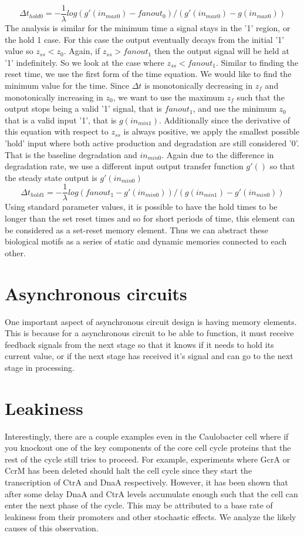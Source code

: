\documentclass{article}
\begin{document}
\[\Delta t_{hold0}= -\frac{1}{\lambda} log(g'(in_{max0}) -fanout_0)/(g'(in_{max0}) -g(in_{max0}))				
\]
The analysis is similar for the minimum time a signal stays in the '1' region, or the hold 1 case.  For this case the output eventually decays from the initial '1' value so $z_{ss}<z_0$. Again, if $z_{ss}>fanout_1$ then the output signal will be held at '1' indefinitely. So we look at the case where $z_{ss}<fanout_1$.  Similar to finding the reset time, we use the first form of the time equation.   We would like to find the minimum value for the time.  Since $\Delta t$ is monotonically decreasing in $z_f$ and monotonically increasing in $z_0$, we want to use the maximum $z_f$ such that the output stops being a valid '1' signal, that is $fanout_1$, and use the minimum $z_0$ that is a valid input '1', that is $g(in_{min1})$.  Additionally since the derivative of this equation with respect to $z_{ss}$ is always positive, we apply the smallest possible 'hold' input where both active production and degradation are still considered '0'.  That is the baseline degradation and $in_{min0}$.  Again due to the difference in degradation rate, we use a different input output transfer function $g'()$ so that the steady state output is $g'(in_{min0})$  
\[\Delta t_{hold1}= -\frac{1}{\lambda} log(fanout_1 -g'(in_{min0}))/(g(in_{min1}) -g'(in_{min0}))
\]
Using standard parameter values, it is possible to have the hold times to be longer than the set reset times and so for short periods of time, this element can be considered as a set-reset memory element.  Thus we can abstract these biological motifs as a series of static and dynamic memories connected to each other.

\section{Asynchronous circuits}
One important aspect of asynchronous circuit design is having memory elements.  This is because for a asynchronous circuit to be able to function, it must receive feedback signals from the next stage so that it knows if it needs to hold its current value, or if the next stage has received it's signal and can go to the next stage in processing.

\section{Leakiness}
Interestingly, there are a couple examples even in the Caulobacter cell where if you knockout one of the key components of the core cell cycle proteins that the rest of the cycle still tries to proceed.  For example, experiments where GcrA or CcrM has been deleted should halt the cell cycle since they start the transcription of CtrA and DnaA respectively.  However, it has been shown that after some delay DnaA and CtrA levels accumulate enough such that the cell can enter the next phase of the cycle.  This may be attributed to a base rate of leakiness from their promoters and other stochastic effects.  We analyze the likely causes of this observation.
\end{document}
